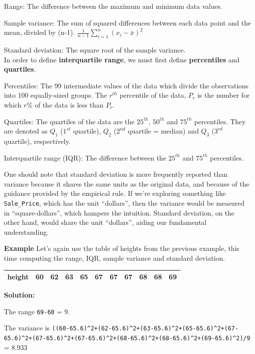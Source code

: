 \documentclass[
  letterpaper,
  DIV=11,
  numbers=noendperiod]{scrreprt}
\begin{document}
Range: The difference between the maximum and minimum data values.

Sample variance: The sum of squared differences between each data point
and the mean, divided by (n-1).
\(\frac{1}{n-1}\sum_{i=1}^n (x_i-\bar{x})^2\)

Standard deviation: The square root of the sample variance.\\

In order to define \textbf{interquartile range}, we must first define
\textbf{percentiles} and \textbf{quartiles}.

Percentiles: The 99 intermediate values of the data which divide the
observations into 100 equally-sized groups. The \(r^{th}\) percentile of
the data, \(P_{r}\) is the number for which \(r\)\% of the data is less
than \(P_{r}\).

Quartiles: The quartiles of the data are the \(25^{th}\), \(50^{th}\)
and \(75^{th}\) percentiles. They are denoted as \(Q_{1}\) (\(1^{st}\)
quartile), \(Q_{2}\) (\(2^{nd}\) quartile = median) and \(Q_{3}\)
(\(3^{rd}\) quartile), respectively.

Interquartile range (IQR): The difference between the \(25^{th}\) and
\(75^{th}\) percentiles.

One should note that standard deviation is more frequently reported than
variance because it shares the same units as the original data, and
because of the guidance provided by the empirical rule. If we're
exploring something like \texttt{Sale\_Price}, which has the unit
``dollars'', then the variance would be measured in ``square-dollars'',
which hampers the intuition. Standard deviation, on the other hand,
would share the unit ``dollars'', aiding our fundamental understanding.

\textbf{Example} Let's again use the table of heights from the previous
example, this time computing the range, IQR, sample variance and
standard deviation.

\begin{longtable}[]{@{}ccccccccccc@{}}
\toprule()
\endhead
height & 60 & 62 & 63 & 65 & 67 & 67 & 67 & 68 & 68 & 69 \\
\bottomrule()
\end{longtable}

\textbf{Solution:}

The range \texttt{69-60} = 9.

The variance is
\texttt{((60-65.6)\^{}2+(62-65.6)\^{}2+(63-65.6)\^{}2+(65-65.6)\^{}2+(67-65.6)\^{}2+(67-65.6)\^{}2+(67-65.6)\^{}2+(68-65.6)\^{}2+(68-65.6)\^{}2+(69-65.6)\^{}2)/9}
= 8.933
\end{document}
